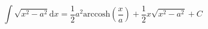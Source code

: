 $$ 
  \int \sqrt{x^2 - a^2} \mathrm{d}x
  = \frac{1}{2} a^2 \mathrm{arccosh} \left ( \frac{x}{a}
  \right ) + \frac{1}{2} x \sqrt {x^2 - a^2} + C
  $$